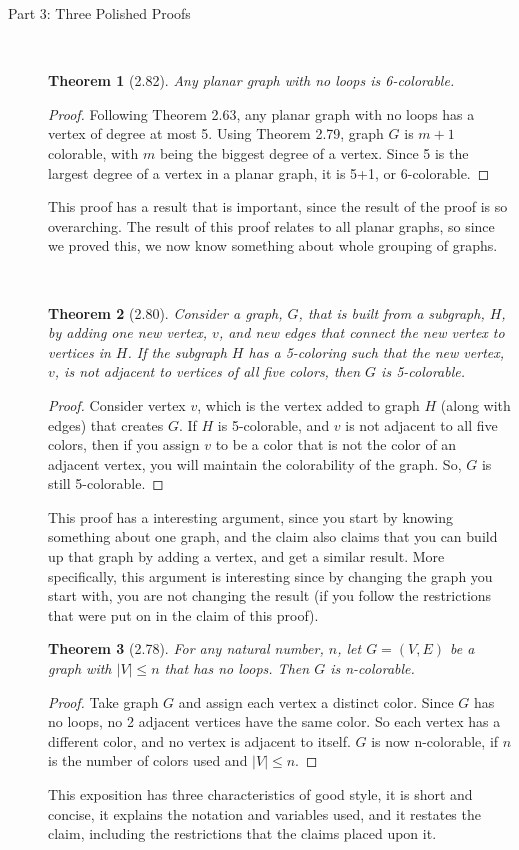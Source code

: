 \documentclass{article}
\newtheorem*{thm}{Theorem}
\begin{document}
\begin{description}
	\item[Part 3: Three Polished Proofs] \hfil \\
		\begin{thm}[2.82]
	  	Any planar graph with no loops is 6-colorable.
	      \end{thm}
	      \begin{proof}
			Following Theorem 2.63, any planar graph with no loops has a vertex of degree at most 5. Using Theorem 2.79,  graph $G$ is $m+1$ colorable, with $m$ being the biggest degree of a vertex.
			Since 5 is the largest degree of a vertex in a planar graph, it is 5+1, or 6-colorable.
	      \end{proof}
			This proof has a result that is important, since the result of the proof is so overarching. The result of this proof
			relates to all planar graphs, so since we proved this, we now know something about whole grouping of graphs.

			\hfil \\

		\begin{thm}[2.80]
		  	Consider a graph, $G$, that is built from a subgraph, $H$, by adding one new vertex, $v$, and new edges that connect the new vertex to vertices in $H$.
			If the subgraph $H$ has a 5-coloring such that the new vertex, $v$, is 
			not adjacent to vertices of all five colors, then $G$ is 5-colorable.
		\end{thm}
		\begin{proof}
			Consider vertex $v$, which is the vertex added to graph $H$ (along with edges) that creates $G$. If $H$ is 5-colorable, and $v$ is not adjacent to all five colors, then if you assign $v$ to be a color
			that is not the color of an adjacent vertex, you will maintain the colorability of the graph. So, $G$ is still 5-colorable.
		 \end{proof}
			This proof has a interesting argument, since you start by knowing something about one graph, and the claim also claims
			that you can build up that graph by adding a vertex, and get a similar result. More specifically, this argument
			is interesting since by changing the graph you start with, you are not changing the result (if you follow the restrictions
			that were put on in the claim of this proof). 


		\begin{thm}[2.78]
		  	For any natural number, $n$, let $G = (V,E)$ be a graph with $|V| \leq n$ that has no loops. Then $G$ is n-colorable. 
	      \end{thm}
	      \begin{proof}
			Take graph $G$ and assign each vertex a distinct color. Since $G$ has no loops, no 2 adjacent vertices have the same color.
			So each vertex has a different color, and no vertex is adjacent to itself. 
			$G$ is now n-colorable, if $n$ is the number of colors used and $|V| \leq n$. 
	      \end{proof}
			This exposition has three characteristics of good style, it is short and concise, it explains the notation and variables used,
			and it restates the claim, including the restrictions that the claims placed upon it.

\end{description}
\end{document}
